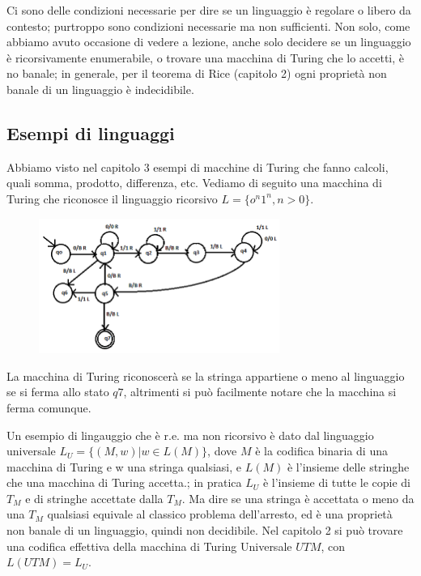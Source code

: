 Ci sono delle condizioni necessarie per dire se un linguaggio è regolare o libero da contesto; purtroppo sono condizioni necessarie ma non sufficienti. Non solo, come abbiamo avuto occasione di vedere a lezione, anche solo decidere se un linguaggio è ricorsivamente enumerabile, o trovare una macchina di Turing che lo accetti, è no banale; in generale, per il teorema di Rice (capitolo 2) ogni proprietà non banale di un linguaggio è indecidibile.

\subsection{Esempi di linguaggi}
 
Abbiamo visto nel capitolo 3 esempi di macchine di Turing che fanno calcoli, quali somma, prodotto, differenza, etc. Vediamo di seguito una macchina di Turing che riconosce il linguaggio ricorsivo $L=\{o^n1^n, n>0\}$.
\begin{figure}[h]
	\includegraphics[width=0.70\textwidth]{img/turing.png}
	\label{fig:Capture}
\end{figure} 
 
La macchina di Turing riconoscerà se la stringa appartiene o meno al linguaggio se si ferma allo stato $q7$, altrimenti si può facilmente notare che la macchina si ferma comunque.

Un esempio di lingauggio che è r.e. ma non ricorsivo è dato dal linguaggio universale $L_U=\{(M,w)|w\in L(M)\}$, dove $M$ è la codifica binaria di una macchina di Turing e w una stringa qualsiasi, e $L(M)$ è l'insieme delle stringhe che una macchina di Turing accetta.; in pratica $L_U$ è l'insieme di tutte le copie di $T_M$  e di stringhe accettate dalla $T_M$. Ma dire se una stringa è accettata o meno da una $T_M$ qualsiasi equivale al classico problema dell'arresto, ed è una proprietà non banale di un linguaggio, quindi non decidibile. Nel capitolo 2 si può trovare una codifica effettiva della macchina di Turing Universale $UTM$, con $L(UTM)=L_U$.

